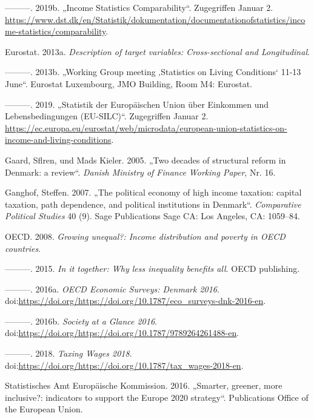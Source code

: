 \documentclass[ngerman,]{article}
\begin{document}
\hypertarget{ref-statdenm}{}
---------. 2019b. „Income Statistics Comparability``. Zugegriffen Januar
2.
\url{https://www.dst.dk/en/Statistik/dokumentation/documentationofstatistics/income-statistics/comparability}.

\hypertarget{ref-silcmanual}{}
Eurostat. 2013a. \emph{Description of target variables: Cross-sectional
and Longitudinal}.

\hypertarget{ref-cawi}{}
---------. 2013b. „Working Group meeting ‚Statistics on Living
Conditions` 11-13 June``. Eurostat Luxembourg, JMO Building, Room M4:
Eurostat.

\hypertarget{ref-eurostatweb}{}
---------. 2019. „Statistik der Europäischen Union über Einkommen und
Lebensbedingungen (EU-SILC)``. Zugegriffen Januar 2.
\url{https://ec.europa.eu/eurostat/web/microdata/european-union-statistics-on-income-and-living-conditions}.

\hypertarget{ref-gaard2005two}{}
Gaard, Sflren, und Mads Kieler. 2005. „Two decades of structural reform
in Denmark: a review``. \emph{Danish Ministry of Finance Working Paper},
Nr. 16.

\hypertarget{ref-ganghof2007political}{}
Ganghof, Steffen. 2007. „The political economy of high income taxation:
capital taxation, path dependence, and political institutions in
Denmark``. \emph{Comparative Political Studies} 40 (9). Sage
Publications Sage CA: Los Angeles, CA: 1059--84.

\hypertarget{ref-oecd2008growing}{}
OECD. 2008. \emph{Growing unequal?: Income distribution and poverty in
OECD countries}.

\hypertarget{ref-oecd2015together}{}
---------. 2015. \emph{In it together: Why less inequality benefits
all}. OECD publishing.

\hypertarget{ref-oecd2016survey}{}
---------. 2016a. \emph{OECD Economic Surveys: Denmark 2016}.
doi:\href{https://doi.org/https://doi.org/https://doi.org/10.1787/eco_surveys-dnk-2016-en}{https://doi.org/https://doi.org/10.1787/eco\_surveys-dnk-2016-en}.

\hypertarget{ref-oecd2016society}{}
---------. 2016b. \emph{Society at a Glance 2016}.
doi:\href{https://doi.org/https://doi.org/https://doi.org/10.1787/9789264261488-en}{https://doi.org/https://doi.org/10.1787/9789264261488-en}.

\hypertarget{ref-oecd2018taxing}{}
---------. 2018. \emph{Taxing Wages 2018}.
doi:\href{https://doi.org/https://doi.org/https://doi.org/10.1787/tax_wages-2018-en}{https://doi.org/https://doi.org/10.1787/tax\_wages-2018-en}.

\hypertarget{ref-europe2020}{}
Statistisches Amt Europäische Kommission. 2016. „Smarter, greener, more
inclusive?: indicators to support the Europe 2020 strategy``.
Publications Office of the European Union.
\end{document}
